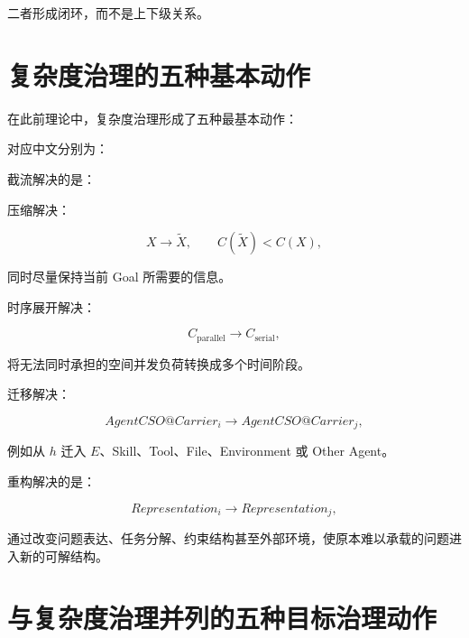 二者形成闭环，而不是上下级关系。


\section{复杂度治理的五种基本动作}

在此前理论中，复杂度治理形成了五种最基本动作：

\begin{statementbox}
\centering
{}
\end{statementbox}

对应中文分别为：

\begin{statementbox}
\centering
{}
\end{statementbox}

截流解决的是：

\begin{statementbox}
\centering
{}
\end{statementbox}

压缩解决：

\[
X
\rightarrow
\widetilde X,
\qquad
C(\widetilde X)<C(X),
\]

同时尽量保持当前 Goal 所需要的信息。

时序展开解决：

\[
C_{\mathrm{parallel}}
\rightarrow
C_{\mathrm{serial}},
\]

将无法同时承担的空间并发负荷转换成多个时间阶段。

迁移解决：

\[
AgentCSO@Carrier_i
\rightarrow
AgentCSO@Carrier_j,
\]

例如从 $h$ 迁入 $E$、Skill、Tool、File、Environment 或 Other Agent。

重构解决的是：

\[
Representation_i
\rightarrow
Representation_j,
\]

通过改变问题表达、任务分解、约束结构甚至外部环境，使原本难以承载的问题进入新的可解结构。


\section{与复杂度治理并列的五种目标治理动作}

